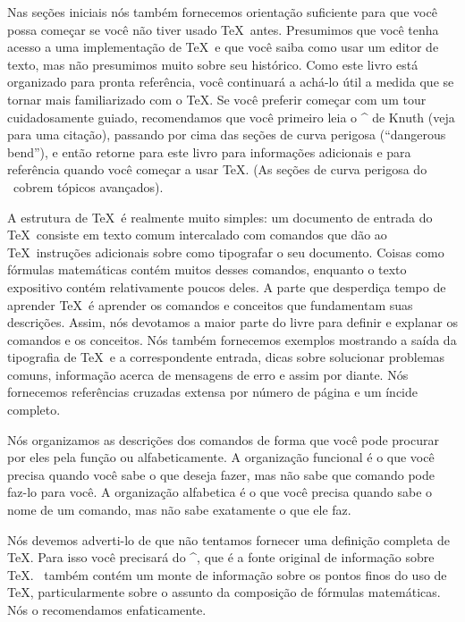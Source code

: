 Nas se\c c\~oes iniciais n\'os tamb\'em fornecemos orienta\c c\~ao 
suficiente para que voc\^e possa come\c car se voc\^e n\~ao tiver usado 
\TeX\ antes.  Presumimos que voc\^e tenha acesso a uma 
implementa\c c\~ao de \TeX\ e que voc\^e saiba como usar um editor de 
texto, mas n\~ao presumimos muito sobre seu hist\'orico.  Como este 
livro est\'a organizado para pronta refer\^encia, voc\^e continuar\'a a 
ach\'a-lo \'util a medida que se tornar mais familiarizado com o \TeX.  
Se voc\^e preferir come\c car com um tour cuidadosamente guiado, 
recomendamos que voc\^e primeiro leia o ^{\texbook} de Knuth (veja 
 para uma cita\c c\~ao), passando por cima das 
se\c c\~oes de curva perigosa (``dangerous bend''), e ent\~ao retorne 
para este livro para informa\c c\~oes adicionais e para refer\^encia 
quando voc\^e come\c car a usar \TeX.  (As se\c c\~oes de curva perigosa 
do \texbook\ cobrem t\'opicos avan\c cados).


A estrutura de \TeX\ \'e realmente muito simples: um documento de 
entrada do \TeX\ consiste em texto comum intercalado com comandos que 
d\~ao ao \TeX\ instru\c c\~oes adicionais sobre como tipografar o seu 
documento.  Coisas como f\'ormulas matem\'aticas cont\'em muitos desses 
comandos, enquanto o texto expositivo cont\'em relativamente poucos 
deles.  A parte que desperdi\c ca tempo de aprender \TeX\ \'e aprender 
os comandos e conceitos que fundamentam suas descri\c c\~oes.  Assim, 
n\'os devotamos a maior parte do livre para definir e explanar os 
comandos e os conceitos.  N\'os tamb\'em fornecemos exemplos mostrando a 
sa\'ida da tipografia de \TeX\ e a correspondente entrada, dicas sobre 
solucionar problemas comuns, informa\c c\~ao acerca de mensagens de erro 
e assim por diante.  N\'os fornecemos refer\^encias cruzadas extensa por 
n\'umero de p\'agina e um \'incide completo.

N\'os organizamos as descri\c c\~oes dos comandos de forma que voc\^e 
pode procurar por eles pela fun\c c\~ao ou alfabeticamente.  A 
organiza\c c\~ao funcional \'e o que voc\^e precisa quando voc\^e sabe o 
que deseja fazer, mas n\~ao sabe que comando pode faz\ê-lo para voc\^e.  
A organiza\c c\~ao alfabetica \'e o que voc\^e precisa quando sabe o 
nome de um comando, mas n\~ao sabe exatamente o que ele faz.

N\'os devemos adverti-lo de que n\~ao tentamos fornecer uma 
defini\c c\~ao completa de \TeX.  Para isso voc\^e precisar\'a do 
^{\texbook}, que \'e a fonte original de informa\c c\~ao sobre \TeX.  
\texbook\ tamb\'em cont\'em um monte de informa\c c\~ao sobre os pontos 
finos do uso de \TeX, particularmente sobre o assunto da composi\c c\~ao 
de f\'ormulas matem\'aticas.  N\'os o recomendamos enfaticamente.


